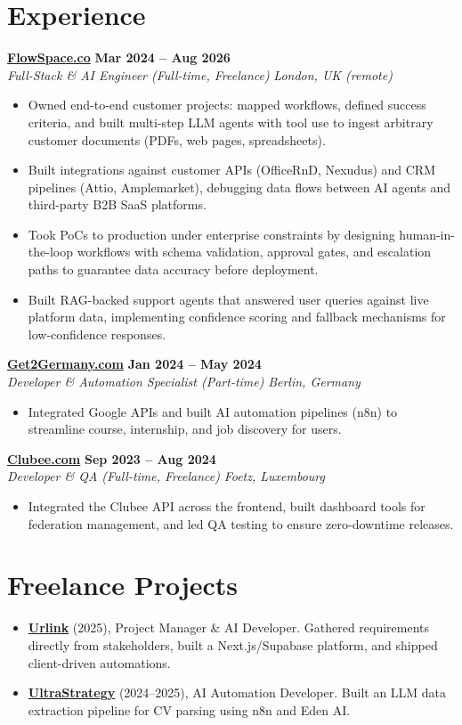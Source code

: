 \documentclass[a4paper,10pt]{article}
\newcommand{\role}[4]{%
 \textbf{#1} \hfill \textbf{#2}\\[1pt]%
 \textit{#3} \hfill \textit{#4}\\[2pt]%
}
\begin{document}
\section{Experience}

\role{\href{https://flowspace.co}{FlowSpace.co}}{Mar 2024 -- Aug 2026}{Full-Stack \& AI Engineer (Full-time, Freelance)}{London, UK (remote)}
\begin{itemize}
 \item Owned end-to-end customer projects: mapped workflows, defined success criteria, and built multi-step LLM agents with tool use to ingest arbitrary customer documents (PDFs, web pages, spreadsheets).
 \item Built integrations against customer APIs (OfficeRnD, Nexudus) and CRM pipelines (Attio, Amplemarket), debugging data flows between AI agents and third-party B2B SaaS platforms.
 \item Took PoCs to production under enterprise constraints by designing human-in-the-loop workflows with schema validation, approval gates, and escalation paths to guarantee data accuracy before deployment.
 \item Built RAG-backed support agents that answered user queries against live platform data, implementing confidence scoring and fallback mechanisms for low-confidence responses.
\end{itemize}

\role{\href{https://get2germany.com}{Get2Germany.com}}{Jan 2024 -- May 2024}{Developer \& Automation Specialist (Part-time)}{Berlin, Germany}
\begin{itemize}
 \item Integrated Google APIs and built AI automation pipelines (n8n) to streamline course, internship, and job discovery for users.
\end{itemize}

\role{\href{https://clubee.com}{Clubee.com}}{Sep 2023 -- Aug 2024}{Developer \& QA (Full-time, Freelance)}{Foetz, Luxembourg}
\begin{itemize}
 \item Integrated the Clubee API across the frontend, built dashboard tools for federation management, and led QA testing to ensure zero-downtime releases.
\end{itemize}

\section{Freelance Projects}
\begin{itemize}
 \item \textbf{\href{https://smarturlink.com/}{Urlink}} (2025), Project Manager \& AI Developer. Gathered requirements directly from stakeholders, built a Next.js/Supabase platform, and shipped client-driven automations.
 \item \textbf{\href{https://ultrastrategy.com}{UltraStrategy}} (2024--2025), AI Automation Developer. Built an LLM data extraction pipeline for CV parsing using n8n and Eden AI.
\end{itemize}
\end{document}
